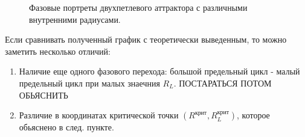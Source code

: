 \documentclass[12pt]{article}
\begin{document}
\begin{figure}[H]
	\centering
	\begin{minipage}[h]{0.47\linewidth}
	\end{minipage}
		\hfill
	\begin{minipage}[h]{0.47\linewidth}
	\end{minipage}
	\caption{Фазовые портреты двухпетлевого аттрактора с различными внутренними радиусами.}
	\label{fig:real_fig_3}
\end{figure}

Если сравнивать полученный график с теоретически выведенным, то можно заметить несколько отличий:
\begin{enumerate}
	\item Наличие еще одного фазового перехода: большой предельный цикл - малый предельный цикл при малых знаечния $R_L$. ПОСТАРАТЬСЯ ПОТОМ ОБЬЯСНИТЬ
	\item Различие в координатах критической точки $(R^{\text{крит}}, R_L^{\text{крит}})$, которое обьяснено в след. пункте.
\end{enumerate}
\end{document}
